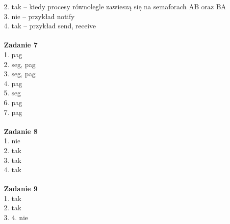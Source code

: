 \documentclass[12pt, a4paper, polish, openany]{book}
\begin{document}
2. tak – kiedy procesy równolegle zawieszą się na semaforach AB oraz BA \\
3. nie – przykład notify \\
4. tak – przykład send, receive \\\\
\textbf{Zadanie 7} \\
1. pag \\
2. seg, pag \\
3. seg, pag \\
4. pag \\
5. seg \\
6. pag \\
7. pag \\\\
\textbf{Zadanie 8} \\
1. nie \\
2. tak \\
3. tak \\
4. tak \\\\
\textbf{Zadanie 9} \\
1. tak \\
2. tak \\
3. 
4. nie \\\\
\end{document}

